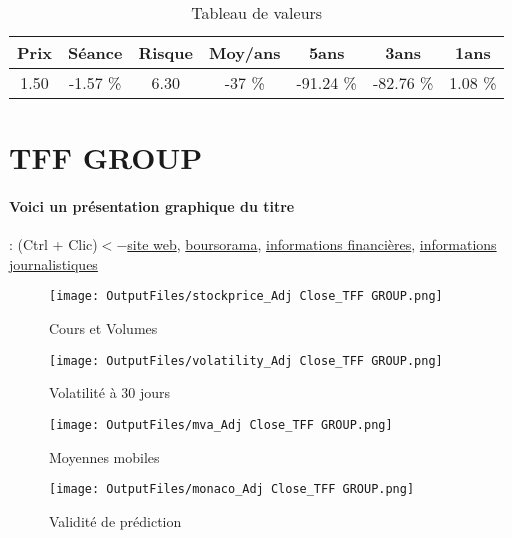 \documentclass[11pt,a4paper]{report}%
\begin{document}
\begin{table}[H]
  \centering
    \begin{tabular}{|c|c|c|c|c|c|c|}
    \hline
    Prix & Séance & Risque  & Moy/ans & 5ans & 3ans & 1ans \\
    \hline
    1.50 &    -1.57 \%    & 6.30 & -37 \% & -91.24 \% & -82.76 \% & 1.08 \% \\
    \hline
    \end{tabular}%
        \label{tab:table_MARIE BRIZARD WINE}%
      \caption{Tableau de valeurs}
\end{table}%

\newpage

\section{TFF GROUP}

\paragraph{Voici un présentation graphique du titre} : (Ctrl + Clic)$<-$\href{http://www.tff-group.com/}{site web}, \href{https://www.boursorama.com/cours/1rPTFF}{boursorama}, \href{https://www.qwant.com/?q=site:https:%2f%2fwww.easybourse.com%2faction-societe%2fTFF-GROUP&t=web&client=ext-firefox-hp}{informations financières}, \href{https://bourse.lerevenu.com/cours-de-bourse/fiche-valeur-synthese/TFF-GROUP/TFF-FR}{informations journalistiques}
\begin{figure}[!htb]
   \begin{minipage}{0.5\textwidth}
     \centering
     \texttt{[image: OutputFiles/stockprice\_Adj Close\_TFF GROUP.png]}
     \caption{Cours et Volumes}\label{Fig:price_TFF GROUP}
   \end{minipage}\hfill
   \begin{minipage}{0.5\textwidth}
     \centering
     \texttt{[image: OutputFiles/volatility\_Adj Close\_TFF GROUP.png]}
     \caption{Volatilité à 30 jours}\label{Fig:volat_TFF GROUP}
   \end{minipage}
\end{figure}
\begin{figure}[!htb]
   \begin{minipage}{0.5\textwidth}
     \centering
     \texttt{[image: OutputFiles/mva\_Adj Close\_TFF GROUP.png]}
     \caption{Moyennes mobiles}\label{Fig:mva_TFF GROUP}
   \end{minipage}\hfill
   \begin{minipage}{0.5\textwidth}
     \centering
     \texttt{[image: OutputFiles/monaco\_Adj Close\_TFF GROUP.png]}
     \caption{Validité de prédiction}\label{Fig:prediction_TFF GROUP}
   \end{minipage}
\end{figure}
\end{document}
